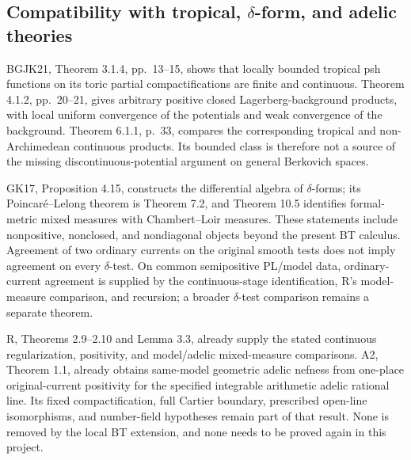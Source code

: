 \documentclass[11pt,a4paper]{article}
\numberwithin{equation}{section}
\theoremstyle{definition}
\theoremstyle{remark}
\begin{document}
\subsection{Compatibility with tropical, \texorpdfstring{$\delta$}{delta}-form, and adelic theories}

BGJK21, Theorem 3.1.4, pp.~13--15, shows that locally bounded tropical psh
functions on its toric partial compactifications are finite and
continuous. Theorem 4.1.2, pp.~20--21, gives arbitrary positive closed
Lagerberg-background products, with local uniform convergence of the
potentials and weak convergence of the background. Theorem 6.1.1,
p.~33, compares the corresponding tropical and non-Archimedean
continuous products. Its bounded class is therefore not a source of
the missing discontinuous-potential argument on general Berkovich spaces.
\cite[Theorems 3.1.4, 4.1.2, 6.1.1]{BGJK21}

GK17, Proposition 4.15, constructs the differential algebra of
\(\delta\)-forms; its Poincar\'e--Lelong theorem is Theorem 7.2, and
Theorem 10.5 identifies formal-metric mixed measures with
Chambert--Loir measures. These statements include nonpositive,
nonclosed, and nondiagonal objects beyond the present BT calculus.
Agreement of two ordinary currents on the original smooth tests does
not imply agreement on every \(\delta\)-test. On common semipositive
PL/model data, ordinary-current agreement is supplied by the
continuous-stage identification, R's model-measure comparison, and
recursion; a broader \(\delta\)-test comparison remains a separate
theorem.\cite[Proposition 4.15, Theorems 7.2, 10.5]{GK17}

R, Theorems 2.9--2.10 and Lemma 3.3, already supply the stated continuous
regularization, positivity, and model/adelic mixed-measure comparisons.
A2, Theorem 1.1, already obtains same-model geometric adelic nefness
from one-place original-current positivity for the specified
integrable arithmetic adelic rational line. Its fixed compactification,
full Cartier boundary, prescribed open-line isomorphisms, and number-field
hypotheses remain part of that result. None is removed by the local BT
extension, and none needs to be proved again in this project.
\end{document}
